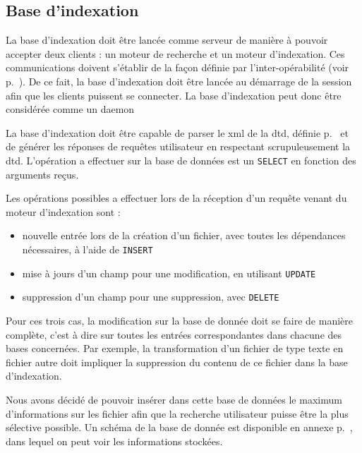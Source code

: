 \documentclass[a4paper,12pt]{report}
\begin{document}
\subsection{Base d'indexation}
La base d'indexation doit être lancée comme serveur de manière à pouvoir accepter deux clients : un moteur de recherche et un moteur d'indexation. Ces communications doivent s'établir de la façon définie par l'inter-opérabilité (voir p.~\pageref{inter_operabilite}). De ce fait, la base d'indexation doit être lancée au démarrage de la session afin que les clients puissent se connecter. La base d'indexation peut donc être considérée comme un \gls{daemon}

La base d'indexation doit être capable de \gls{parser} le \gls{xml} de la \gls{dtd}, définie p.~\pageref{dtd} et de générer les réponses de requêtes utilisateur en respectant scrupuleusement la \gls{dtd}. L'opération a effectuer sur la base de données est un \verb"SELECT" en fonction des arguments reçus.

Les opérations possibles a effectuer lors de la réception d'un requête venant du moteur d'indexation sont :
\begin{itemize}
\item nouvelle entrée lors de la création d'un \gls{fichier}, avec toutes les dépendances nécessaires, à l'aide de \verb"INSERT"
\item mise à jours d'un champ pour une modification, en utilisant \verb"UPDATE"
\item suppression d'un champ pour une suppression, avec \verb"DELETE"
\end{itemize}
Pour ces trois cas, la modification sur la base de donnée doit se faire de manière complète, c'est à dire sur toutes les entrées correspondantes dans chacune des bases concernées. Par exemple, la transformation d'un fichier de type texte en fichier autre doit impliquer la suppression du contenu de ce fichier dans la base d'indexation.

Nous avons décidé de pouvoir insérer dans cette base de données le maximum d'informations sur les \gls{fichier} afin que la recherche utilisateur puisse être la plus sélective possible. Un schéma de la base de donnée est disponible en annexe p.~\pageref{bdd}, dans lequel on peut voir les informations stockées.
\end{document}
